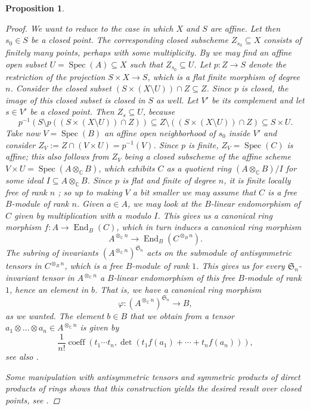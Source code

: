 \documentclass[12pt,a4paper]{amsart}
\theoremstyle{plain}
\newtheorem{prop}[thm]{Proposition}
\theoremstyle{definition}
\theoremstyle{remark}
\begin{document}
\begin{prop}
\begin{proof}
    We want to reduce to the case in which $X$ and $S$ are affine.
    Let then $s_{0} \in S$ be a closed point.
    The corresponding closed subscheme $Z_{s_{0}} \subseteq X$ consists of finitely many points, perhaps with some multiplicity.
    By  we may find an affine open subset $U = \operatorname{Spec}(A) \subseteq X$ such that $Z_{s_{0}} \subseteq U$.
    Let $p \colon Z \to S$ denote the restriction of the projection $S \times X \to S$, which is a flat finite morphism of degree $n$.
    Consider the closed subset $(S \times (X\setminus U)) \cap Z \subseteq Z$.
    Since $p$ is closed, the image of this closed subset is closed in $S$ as well.
    Let $V'$ be its complement and let $s \in V'$ be a closed point.
    Then $Z_{s} \subseteq U$, because
    \[ p^{-1}(S \setminus p((S \times (X \setminus U)) \cap Z)) \subseteq Z \setminus ((S \times (X \setminus U)) \cap Z) \subseteq S \times U. \]
    Take now $V = \operatorname{Spec}(B)$ an affine open neighborhood of $s_{0}$ inside $V'$ and consider $Z_{V} := Z \cap (V \times U) = p^{-1}(V)$.
    Since $p$ is finite, $Z_{V} = \operatorname{Spec}(C)$ is affine; this also follows from $Z_{V}$ being a closed subscheme of the affine scheme $V \times U = \operatorname{Spec}(A \otimes_{\mathbb{C}} B)$, which exhibits $C$ as a quotient ring $(A \otimes_{\mathbb{C}} B)/I$ for some ideal $I \subseteq A \otimes_{\mathbb{C}}B$.
    Since $p$ is flat and finite of degree $n$, it is finite locally free of rank $n$ \cite[\href{https://stacks.math.columbia.edu/tag/02KB}{Tag 02KB}]{stacks-project}; so up to making $V$ a bit smaller we may assume that $C$ is a free $B$-module of rank $n$. 
    Given $a \in A$, we may look at the $B$-linear endomorphism of $C$ given by multiplication with $a$ modulo $I$.
    This gives us a canonical ring morphism $f \colon A \to \operatorname{End}_{B}(C)$, which in turn induces a canonical ring morphism
    \[ A^{\otimes_{\mathbb{C}} n} \to \operatorname{End}_{B}(C^{\otimes_{B} n}). \]
    The subring of invariants $(A^{\otimes_{\mathbb{C}} n})^{\mathfrak{S}_{n}}$ acts on the submodule of antisymmetric tensors in $C^{\otimes_{B} n}$, which is a free $B$-module of rank $1$.
    This gives us for every $\mathfrak{S}_{n}$-invariant tensor in $A^{\otimes_{\mathbb{C}} n}$ a $B$-linear endomorphism of this free $B$-module of rank $1$, hence an element in $b$.
    That is, we have a canonical ring morphism
    \[ \varphi \colon (A^{\otimes_{\mathbb{C}} n})^{\mathfrak{S}_{n}} \to B, \]
    as we wanted.
    The element $b \in B$ that we obtain from a tensor $a_{1} \otimes \ldots \otimes a_{n} \in A^{\otimes_{\mathbb{C}}n}$ is given by
    \[ \frac{1}{n!}\operatorname{coeff}(t_{1} \cdots t_{n}, \det(t_{1}f(a_{1}) + \cdots + t_{n}f(a_{n}))), \]
    see also \cite[Proposition 2.17]{ber08}.

    Some manipulation with antisymmetric tensors and symmetric products of direct products of rings shows that this construction yields the desired result over closed points, see \cite[p.~9]{leh00}.
  \end{proof}
\end{prop}
\end{document}

